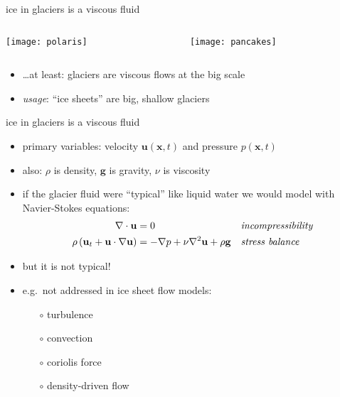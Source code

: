 \documentclass{beamer}
\newcommand{\bx}{\mathbf{x}}
\begin{document}
\begin{frame}{ice in glaciers is a viscous fluid}
\begin{columns}
\begin{column}{0.65\textwidth}
\texttt{[image: polaris]}
\end{column}
\begin{column}{0.35\textwidth}
\texttt{[image: pancakes]}
\end{column}
\end{columns}

\bigskip\bigskip
\begin{itemize}
\item \dots at least: glaciers are viscous flows at the big scale
\item \emph{usage}: ``ice sheets'' are big, shallow glaciers
\end{itemize}
\end{frame}


\begin{frame}{ice in glaciers is a viscous fluid}

\begin{itemize}
\item primary variables: velocity $\mathbf{u}(\bx,t)$ and pressure $p(\bx,t)$
\item also: $\rho$ is density, $\mathbf{g}$ is gravity, $\nu$ is viscosity
\item if the glacier fluid were ``typical'' like liquid water we would model with Navier-Stokes equations:
\begin{align*}
\nabla \cdot \mathbf{u} &= 0 &&\text{\emph{incompressibility}} \\
\rho \left(\mathbf{u}_t + \mathbf{u}\cdot\nabla \mathbf{u}\right) &= -\nabla p + \nu \nabla^2 \mathbf{u} + \rho \mathbf{g} &&\text{\emph{stress balance}}
\end{align*}
\item but it is not typical!
\item e.g.~not addressed in ice sheet flow models:
  \begin{itemize}
  \item[$\circ$] turbulence
  \item[$\circ$] convection
  \item[$\circ$] coriolis force
  \item[$\circ$] density-driven flow
  \end{itemize}
\end{itemize}
\end{frame}
\end{document}
